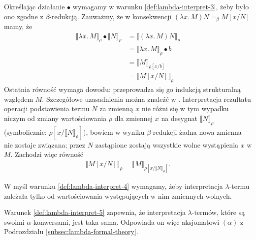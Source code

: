 Określając działanie \(\bullet\) wymagamy w warunku \ref{def:lambda-interpret-3}, żeby było ono zgodne z \(\beta\)-redukcją. Zauważmy, że w konsekwencji \((\lambda x.\,M) N =_\beta M[x/N]\) mamy, że
\begin{align*}
  \llbracket \lambda x.\,M \rrbracket_\rho \bullet \llbracket N \rrbracket_\rho 
    &= \llbracket (\lambda x.\,M) N\rrbracket_\rho \\
    &= \llbracket \lambda x.\,M \rrbracket_\rho \bullet b \\
    &= \llbracket M \rrbracket_{\rho[x/b]} \\
    &= \llbracket M[x/N] \rrbracket_\rho\tag{\dagger}\label{eq:abstraction-to-substitution-in-model}
\end{align*}
Ostatnia równość wymaga dowodu: przeprowadza się go indukcją strukturalną względem \(M\). Szczegółowe uzasadnienia można znaleźć w \cite[Tw. 15.10(a)]{Hindley:2008:LCI:1388400}. Interpretacja rezultatu operacji podstawienia termu \(N\) za zmienną \(x\) nie różni się w tym wypadku niczym od zmiany wartościowania \(\rho\) dla zmiennej \(x\) na desygnat \(\llbracket N\rrbracket_\rho\) (symbolicznie: \(\rho[x/\llbracket N \rrbracket_\rho])\), bowiem w wyniku \(\beta\)-redukcji żadna nowa zmienna nie zostaje związana; przez \(N\) zastąpione zostają wszystkie wolne wystąpienia \(x\) w \(M\). Zachodzi więc równość
\begin{align*}
  \llbracket M[x/N] \rrbracket_\rho = \llbracket M \rrbracket_{\rho[x/\llbracket N \rrbracket_\rho]}.
\end{align*}

W myśl warunku \ref{def:lambda-interpret-4} wymagamy, żeby interpretacja \(\lambda\)-termu zależała tylko od wartościowania występujących w nim zmiennych wolnych. 

Warunek \ref{def:lambda-interpret-5} zapewnia, że interpretacja \(\lambda\)-termów, które są swoimi \(\alpha\)-konwersami, jest taka sama. Odpowiada on więc aksjomatowi \((\alpha)\) z Podrozdziału \ref{subsec:lambda-formal-theory}.

  
